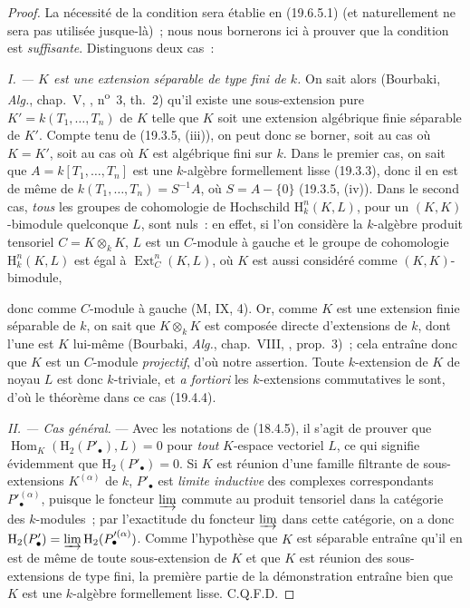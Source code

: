 \begin{proof}
La nécessité de la condition sera établie en (19.6.5.1) (et naturellement ne
sera pas utilisée jusque-là)~; nous nous bornerons ici à prouver que la
condition est \emph{suffisante}. Distinguons deux cas~:

\emph{I. --- $K$ est une extension séparable de type fini de $k$.} On sait
alors (Bourbaki, \emph{Alg.}, chap.~V, ,
n\textsuperscript{o}~3, th.~2) qu'il existe une sous-extension pure
$K'=k(T_1,\ldots,T_n)$ de $K$ telle que $K$ soit une extension algébrique
finie séparable de $K'$. Compte tenu de (19.3.5, (iii)), on peut donc se
borner, soit au cas où $K=K'$, soit au cas où $K$ est algébrique fini sur $k$.
Dans le premier cas, on sait que $A=k[T_1,\ldots,T_n]$ est une $k$-algèbre
formellement lisse (19.3.3), donc il en est de même de
$k(T_1,\ldots,T_n)=S^{-1}A$, où $S=A-\{0\}$ (19.3.5, (iv)). Dans le second
cas, \emph{tous} les groupes de cohomologie de Hochschild
$\mathrm H_k^n(K,L)$, pour un $(K,K)$-bimodule quelconque $L$, sont nuls~: en
effet, si l'on considère la $k$-algèbre produit tensoriel $C=K\otimes_k K$,
$L$ est un $C$-module à gauche et le groupe de cohomologie
$\mathrm H_k^n(K,L)$ est égal à $\operatorname{Ext}_C^n(K,L)$, où $K$ est
aussi considéré comme $(K,K)$-bimodule,


donc comme $C$-module à gauche (M, IX, 4). Or, comme $K$ est une extension
finie séparable de $k$, on sait que $K\otimes_k K$ est composée directe
d'extensions de $k$, dont l'une est $K$ lui-même (Bourbaki, \emph{Alg.},
chap.~VIII, , prop.~3)~; cela entraîne donc que $K$ est un
$C$-module \emph{projectif}, d'où notre assertion. Toute $k$-extension de $K$
de noyau $L$ est donc $k$-triviale, et \emph{a fortiori} les $k$-extensions
commutatives le sont, d'où le théorème dans ce cas (19.4.4).

\emph{II. --- Cas général.} --- Avec les notations de (18.4.5), il s'agit de
prouver que $\operatorname{Hom}_K(\mathrm H_2(P'_\bullet),L)=0$ pour
\emph{tout} $K$-espace vectoriel $L$, ce qui signifie évidemment que
$\mathrm H_2(P'_\bullet)=0$. Si $K$ est réunion d'une famille filtrante de
sous-extensions $K^{(\alpha)}$ de $k$, $P'_\bullet$ est \emph{limite
inductive} des complexes correspondants $P'^{(\alpha)}_\bullet$, puisque le
foncteur $\varinjlim$ commute au produit tensoriel dans la catégorie des
$k$-modules~; par l'exactitude du foncteur $\varinjlim$ dans cette catégorie,
on a donc
$\mathrm H_2(P'_\bullet)=\varinjlim\mathrm H_2(P'^{(\alpha)}_\bullet)$.
Comme l'hypothèse que $K$ est séparable entraîne qu'il en est de même de toute
sous-extension de $K$ et que $K$ est réunion des sous-extensions de type fini,
la première partie de la démonstration entraîne bien que $K$ est une
$k$-algèbre formellement lisse. C.Q.F.D.
\end{proof}

